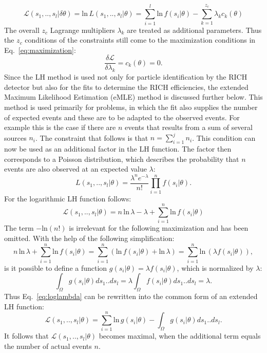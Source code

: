%
\begin{equation}
  \mathscr{L}\left(s_1,..,s_l|\delta\theta \right) = \text{ln}\, L\left(s_1,..,s_l|\theta \right) = \sum_{i=1}^{l} \text{ln}\, f(s_i|\theta) - \sum_{k=1}^{z_{c}} \lambda_k c_k(\theta)
\end{equation}
%
The overall $z_c$ Lagrange multipliers $\lambda_k$ are treated as additional parameters. Thus the $z_c$ conditions of the constraints still come to the maximization conditions in Eq.~\ref{eq:maximization}:
%
\begin{equation}
  \frac{\delta \mathscr{L}}{\delta \lambda_k} = c_k(\theta) = 0.
\end{equation}
%
Since the LH method is used not only for particle identification by the RICH detector but also for the fits to determine the RICH efficiencies, the extended Maximum Likelihood Estimation (eMLE) method is discussed further below. This method is used primarily for problems, in which the fit also supplies the number of expected events and these are to be adapted to the observed events. For example this is the case if there are $n$ events that results from a sum of several sources $n_i$. The constraint that follows is that $n = \sum_{i=1}^{j} n_i$. This condition can now be used as an additional factor in the LH function. The factor then corresponds to a Poisson distribution, which describes the probability that $n$ events are also observed at an expected value $\lambda$:
%
\begin{equation}
  L\left(s_1,..,s_l|\theta \right) = \frac{\lambda^n e^{-\lambda}}{n!} \prod_{i=1}^{n} f(s_i|\theta).
\end{equation}
%
For the logarithmic LH function follows:
%
\begin{equation}\label{eq:loglambda}
  \mathscr{L}\left(s_1,..,s_l|\theta \right) = n \,\text{ln}\, \lambda - \lambda + \sum_{i=1}^{n} \text{ln}\,f(s_i|\theta)
\end{equation}
%
The term $- \text{ln} (n!)$ is irrelevant for the following maximization and has been omitted. With the help of the following simplification:
%
\begin{equation}
  n \,\text{ln}\, \lambda + \sum_{i=1}^{n} \text{ln}\, f(s_i|\theta) =  \sum_{i=1}^{n} \left(\text{ln}\, f(s_i|\theta) + \text{ln}\, \lambda \right) = \sum_{i=1}^{n} \text{ln}\, (\lambda f(s_i|\theta)),
\end{equation}
%
is it possible to define a function $g(s_i|\theta) = \lambda f(s_i|\theta)$, which is normalized by $\lambda$:
%
\begin{equation}
  \int_{\Omega} g(s_i|\theta) ds_1 .. ds_l = \lambda \int_{\Omega} f(s_i|\theta)ds_1 .. ds_l  = \lambda.
\end{equation}
%
Thus Eq.~\ref{eq:loglambda} can be rewritten into the common form of an extended LH function:
%
\begin{equation}
  \mathscr{L}\left(s_1,..,s_l|\theta \right) = \sum_{i=1}^{n} \text{ln}\, g(s_i|\theta) - \int_{\Omega} g(s_i|\theta) ds_1 .. ds_l.
\end{equation}
%
It follows that $\mathscr{L}\left(s_1,..,s_l|\theta \right)$ becomes maximal, when the additional term equals the number of actual events $n$.

